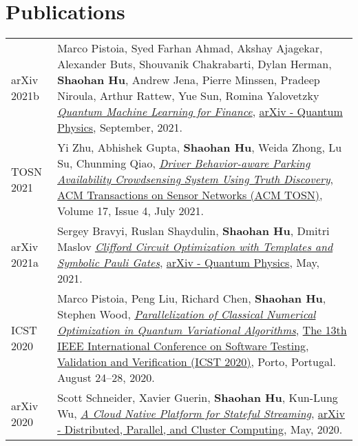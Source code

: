 \section{\sc Publications}

\renewcommand{\arraystretch}{1.8}

\begin{longtabu}{p{.51\sectionwidth} p{.78\resumewidth}}

{\sc arXiv 2021b}\hypertarget{pistoia2021arxiv}{} &
Marco Pistoia, Syed Farhan Ahmad, Akshay Ajagekar, Alexander Buts, Shouvanik Chakrabarti, Dylan Herman, \textbf{Shaohan Hu}, Andrew Jena, Pierre Minssen, Pradeep Niroula, Arthur Rattew, Yue Sun, Romina Yalovetzky
\href{https://arxiv.org/abs/2109.04298}{\emph{Quantum Machine Learning for Finance}},
\href{https://arxiv.org/list/quant-ph/recent}{\textsf{arXiv - Quantum Physics}},
September, 2021. \\

{\sc TOSN 2021}\hypertarget{zhu2021tosn}{} &
Yi Zhu, Abhishek Gupta, \textbf{Shaohan Hu}, Weida Zhong, Lu Su, Chunming Qiao,
\href{https://dl.acm.org/doi/abs/10.1145/3460200}{\emph{Driver Behavior-aware Parking Availability Crowdsensing System Using Truth Discovery}},
\href{https://dl.acm.org/journal/tosn}{\textsf{ACM Transactions on Sensor Networks (ACM TOSN)}},
Volume 17, Issue 4, July 2021. \\

{\sc arXiv 2021a}\hypertarget{bravyi2021arxiv}{} &
Sergey Bravyi, Ruslan Shaydulin, \textbf{Shaohan Hu}, Dmitri Maslov
\href{https://arxiv.org/abs/2105.02291}{\emph{Clifford Circuit Optimization with Templates and Symbolic Pauli Gates}},
\href{https://arxiv.org/list/quant-ph/recent}{\textsf{arXiv - Quantum Physics}},
May, 2021. \\

{\sc ICST 2020}\hypertarget{pistoia2020icst}{} &
Marco Pistoia, Peng Liu, Richard Chen, \textbf{Shaohan Hu}, Stephen Wood,
\href{https://ieeexplore.ieee.org/abstract/document/9159094}{\emph{Parallelization of Classical Numerical Optimization in Quantum Variational Algorithms}},
\href{https://icst2020.info/}{\textsf{The 13th IEEE International Conference on Software Testing, Validation and Verification (ICST 2020)}},
Porto, Portugal. August 24--28, 2020. \\

{\sc arXiv 2020}\hypertarget{schneider2020arxiv}{} &
Scott Schneider, Xavier Guerin, \textbf{Shaohan Hu}, Kun-Lung Wu,
\href{https://arxiv.org/abs/2006.00064}{\emph{A Cloud Native Platform for Stateful Streaming}},
\href{https://arxiv.org/list/cs.DC/recent}{\textsf{arXiv - Distributed, Parallel, and Cluster Computing}},
May, 2020. \\


\end{longtabu}
